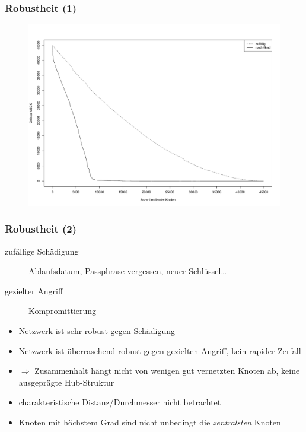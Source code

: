 \documentclass[10pt]{beamer}
\begin{document}
\begin{frame}
  \frametitle{Robustheit (1)}
  \begin{figure}
    \centering
    \includegraphics[scale=0.3]{../ausarbeitung/images/without.pdf}
  \end{figure}
\end{frame}

\begin{frame}
  \frametitle{Robustheit (2)}
  \begin{description}
  \item[zuf\"allige Sch\"adigung] Ablaufsdatum, Passphrase
    vergessen, neuer Schl\"ussel\dots
  \item[gezielter Angriff] Kompromittierung
\end{description}
\begin{itemize}
  \item Netzwerk ist sehr robust gegen Sch\"adigung
  \item Netzwerk ist \"uberraschend robust gegen gezielten Angriff,
    kein rapider Zerfall
  \item $\Rightarrow$ Zusammenhalt h\"angt nicht von wenigen gut
    vernetzten Knoten ab, keine ausgepr\"agte Hub-Struktur
  \item charakteristische Distanz/Durchmesser nicht betrachtet
  \item Knoten mit h\"ochstem Grad sind nicht unbedingt die
    \emph{zentralsten} Knoten
  \end{itemize}
  
\end{frame}
\end{document}
